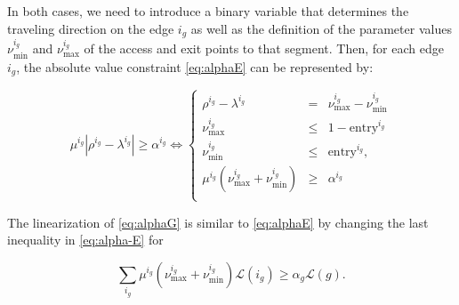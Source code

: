 \bigskip

In both cases, we need to introduce a binary variable that determines the traveling direction on the edge $i_g$ as well as the definition of the parameter values $\nu_\text{min}^{i_g}$ and $\nu_\text{max}^{i_g}$ of the access and exit points to that segment. Then, for each edge $i_g$, the absolute value constraint \eqref{eq:alphaE} can be represented by:

\begin{equation}\label{eq:alpha-E}\tag{$\alpha$-E}
 \mu^{i_g}|\rho^{i_g}-\lambda^{i_g}|\geq \alpha^{i_g} \Longleftrightarrow
 \left\{
 \begin{array}{ccl}
  \rho^{i_g} - \lambda^{i_g}                       & =    & \nu_\text{max}^{i_g} - \nu_\text{min}^{i_g}                                     \\
  \nu_\text{max}^{i_g}                         & \leq & 1-\text{entry}^{i_g}                                    \\
  \nu_\text{min}^{i_g}                      & \leq & \text{entry}^{i_g},                                        \\
  \mu^{i_g}(\nu_\text{max}^{i_g} + \nu_\text{min}^{i_g} ) & \geq & \alpha^{i_g}
  \\
 \end{array}
 \right.
\end{equation}

The linearization of \eqref{eq:alphaG} is similar to \eqref{eq:alphaE} by changing the last inequality in \eqref{eq:alpha-E} for

\begin{equation}\label{eq:alpha-G}\tag{$\alpha$-G}
\sum_{i_g} \mu^{i_g}(\nu_\text{max}^{i_g} + \nu_\text{min}^{i_g})\mathcal L(i_g)\geq \alpha_g\mathcal L(g).
\end{equation}

